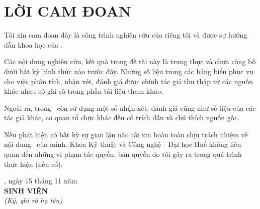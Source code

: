 \chapter*{LỜI CAM ĐOAN}

Tôi xin cam đoan đây là công trình nghiên cứu của riêng tôi và được sự hướng dẫn khoa học của \nguoihuongdan.

Các nội dung nghiên cứu, kết quả trong đề tài này là trung thực và chưa công bố dưới bất kỳ hình thức nào trước đây. Những số liệu trong các bảng biểu phục vụ cho việc phân tích, nhận xét, đánh giá được chính tác giả thu thập từ các nguồn khác nhau có ghi rõ trong phần tài liệu tham khảo.

Ngoài ra, trong \loaihinhdoan\ còn sử dụng một số nhận xét, đánh giá cũng như số liệu của các tác giả khác, cơ quan tổ chức khác đều có trích dẫn và chú thích nguồn gốc.

Nếu phát hiện có bất kỳ sự gian lận nào tôi xin hoàn toàn chịu trách nhiệm về nội dung \loaihinhdoan\ của mình. Khoa Kỹ thuật và Công nghệ - Đại học Huế không liên quan đến những vi phạm tác quyền, bản quyền do tôi gây ra trong quá trình thực hiện (nếu có).

\vspace{1.5cm}
\begin{flushright}
\thanhpho, ngày 15 tháng 11 năm \namtotnghiep\ \\
\textbf{SINH VIÊN} \\
\textit{(Ký, ghi rõ họ tên)} \\[1.5cm]
\textbf{\sinhvien}
\end{flushright}
